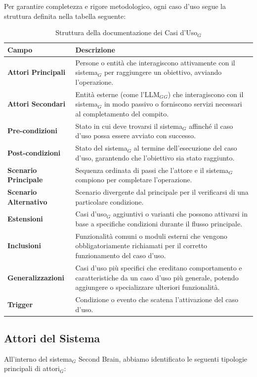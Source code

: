\documentclass[a4paper, 10pt]{article}
\begin{document}
Per garantire completezza e rigore metodologico, ogni caso d'uso segue la struttura definita nella tabella seguente:

\begin{table}[h!]
\centering
\renewcommand{\arraystretch}{1.5}
\begin{tabular}{|l|p{10cm}|}
\hline
\rowcolor[HTML]{EFEFEF} 
\textbf{Campo} & \textbf{Descrizione} \\ \hline
\textbf{Attori Principali} & Persone o entità che interagiscono attivamente con il sistema$_G$ per raggiungere un obiettivo, avviando l'operazione. \\ \hline
\textbf{Attori Secondari} & Entità esterne (come l'LLM$_G$$_{G}$) che interagiscono con il sistema$_G$ in modo passivo o forniscono servizi necessari al completamento del compito. \\ \hline
\textbf{Pre-condizioni} & Stato in cui deve trovarsi il sistema$_G$ affinché il caso d'uso possa essere avviato con successo. \\ \hline
\textbf{Post-condizioni} & Stato del sistema$_G$ al termine dell'esecuzione del caso d'uso, garantendo che l'obiettivo sia stato raggiunto. \\ \hline
\textbf{Scenario Principale} & Sequenza ordinata di passi che l'attore e il sistema$_G$ compiono per completare l'operazione. \\ \hline
\textbf{Scenario Alternativo} & Scenario divergente dal principale per il verificarsi di una particolare condizione. \\ \hline
\textbf{Estensioni} & Casi d'uso$_G$ aggiuntivi o varianti che possono attivarsi in base a specifiche condizioni durante il flusso principale. \\ \hline
\textbf{Inclusioni} & Funzionalità comuni o moduli esterni che vengono obbligatoriamente richiamati per il corretto funzionamento del caso d'uso. \\ \hline
\textbf{Generalizzazioni} & Casi d’uso più specifici che ereditano comportamento e caratteristiche da un caso d’uso più generale, potendo aggiungere o specializzare ulteriori funzionalità. \\ \hline
\textbf{Trigger} & Condizione o evento che scatena l'attivazione del caso d'uso. \\ \hline
\end{tabular}
\caption{Struttura della documentazione dei Casi d'Uso$_G$}
\end{table}
\newpage
\subsection{Attori del Sistema} 
All'interno del sistema$_G$ Second Brain, abbiamo identificato le seguenti tipologie principali di attori$_G$:
\end{document}
